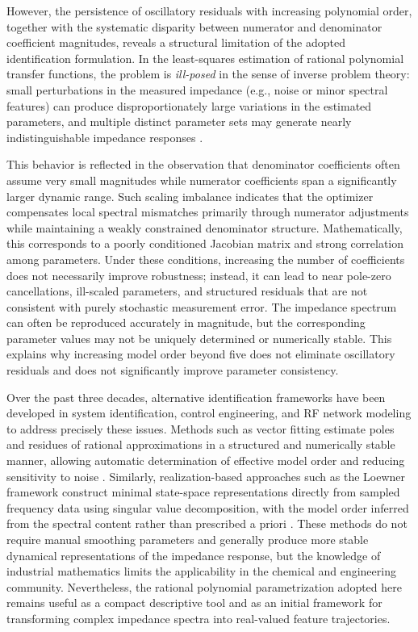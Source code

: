 However, the persistence of oscillatory residuals with increasing polynomial order, together with the systematic disparity between numerator and denominator coefficient magnitudes, reveals a structural limitation of the adopted identification formulation. 
In the least-squares estimation of rational polynomial transfer functions, the problem is \emph{ill-posed} in the sense of inverse problem theory: small perturbations in the measured impedance (e.g., noise or minor spectral features) can produce disproportionately large variations in the estimated parameters, and multiple distinct parameter sets may generate nearly indistinguishable impedance responses \cite{vogelComputationalMethodsInverse2002, ljungSystemIdentificationTheory1999}. 

This behavior is reflected in the observation that denominator coefficients often assume very small magnitudes while numerator coefficients span a significantly larger dynamic range. 
Such scaling imbalance indicates that the optimizer compensates local spectral mismatches primarily through numerator adjustments while maintaining a weakly constrained denominator structure. 
Mathematically, this corresponds to a poorly conditioned Jacobian matrix and strong correlation among parameters. 
Under these conditions, increasing the number of coefficients does not necessarily improve robustness; instead, it can lead to near pole-zero cancellations, ill-scaled parameters, and structured residuals that are not consistent with purely stochastic measurement error.
The impedance spectrum can often be reproduced accurately in magnitude, but the corresponding parameter values may not be uniquely determined or numerically stable. 
This explains why increasing model order beyond five does not eliminate oscillatory residuals and does not significantly improve parameter consistency.

Over the past three decades, alternative identification frameworks have been developed in system identification, control engineering, and RF network modeling to address precisely these issues. 
Methods such as vector fitting estimate poles and residues of rational approximations in a structured and numerically stable manner, allowing automatic determination of effective model order and reducing sensitivity to noise \cite{gustavsenRationalApproximationFrequency1999,gustavsenImprovingPoleRelocating2006}. 
Similarly, realization-based approaches such as the Loewner framework construct minimal state-space representations directly from sampled frequency data using singular value decomposition, with the model order inferred from the spectral content rather than prescribed a priori \cite{antoulasApproximationLargeScaleDynamical2005, mayoFrameworkSolutionGeneralized2007}. 
These methods do not require manual smoothing parameters and generally produce more stable dynamical representations of the impedance response, but the knowledge of industrial mathematics limits the applicability in the chemical and engineering community.
Nevertheless, the rational polynomial parametrization adopted here remains useful as a compact descriptive tool and as an initial framework for transforming complex impedance spectra into real-valued feature trajectories.

